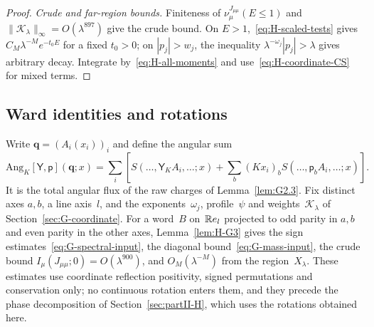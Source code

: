 \begin{proof}
\emph{Crude and far-region bounds.} Finiteness of $\nu_\mu^{J_{\mu\mu}}(E\le1)$ and $\|\mathcal K_\lambda\|_\infty=O(\lambda^{897})$ give the crude bound. On $E>1$,~\eqref{eq:H-scaled-tests} gives $C_M\lambda^{-M}e^{-t_0E}$ for a fixed $t_0>0$; on $|p_j|>w_j$, the inequality $\lambda^{-\omega_j}|p_j|>\lambda$ gives arbitrary decay. Integrate by~\eqref{eq:H-all-moments} and use~\eqref{eq:H-coordinate-CS} for mixed terms.
\end{proof}

\subsection{Ward identities and rotations}\label{sec:partII-G.3}

Write $\boldsymbol q=(A_i(x_i))_i$ and define the angular sum
\begin{equation}\label{eq:G-angular}
\mathrm{Ang}_K[\mathsf Y,\mathsf p](\boldsymbol q;x)=\sum_i\left[
 S(\ldots,\mathsf Y_KA_i,\ldots;x)+\sum_b(Kx_i)_bS(\ldots,\mathsf p_bA_i,\ldots;x)\right].
\end{equation}
It is the total angular flux of the raw charges of Lemma~\ref{lem:G2.3}. Fix distinct axes $a,b$, a line axis~$l$, and the exponents~$\omega_j$, profile~$\psi$ and weights~$\mathcal K_\lambda$ of Section~\ref{sec:G-coordinate}. For a word~$B$ on~$\mathbb{R} e_l$ projected to odd parity in $a,b$ and even parity in the other axes, Lemma~\ref{lem:H-G3} gives the sign estimates~\eqref{eq:G-spectral-input}, the diagonal bound~\eqref{eq:G-mass-input}, the crude bound $I_\mu(J_{\mu\mu};0)=O(\lambda^{900})$, and $O_M(\lambda^{-M})$ from the region~$X_\lambda$. These estimates use coordinate reflection positivity, signed permutations and conservation only; no continuous rotation enters them, and they precede the phase decomposition of Section~\ref{sec:partII-H}, which uses the rotations obtained here.


